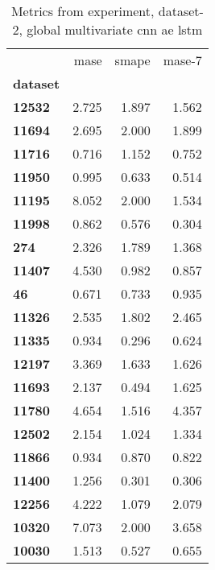 \begin{table}[h]
\centering
\caption{Metrics from experiment, dataset-2, global multivariate cnn ae lstm}
\label{table:global-multivariate-cnn-ae-lstm-dataset-2}
\begin{tabular}{lrrr}
\toprule
{} &   mase &  smape &  mase-7 \\
\textbf{dataset} &        &        &         \\
\midrule
\textbf{12532  } &  2.725 &  1.897 &   1.562 \\
\textbf{11694  } &  2.695 &  2.000 &   1.899 \\
\textbf{11716  } &  0.716 &  1.152 &   0.752 \\
\textbf{11950  } &  0.995 &  0.633 &   0.514 \\
\textbf{11195  } &  8.052 &  2.000 &   1.534 \\
\textbf{11998  } &  0.862 &  0.576 &   0.304 \\
\textbf{274    } &  2.326 &  1.789 &   1.368 \\
\textbf{11407  } &  4.530 &  0.982 &   0.857 \\
\textbf{46     } &  0.671 &  0.733 &   0.935 \\
\textbf{11326  } &  2.535 &  1.802 &   2.465 \\
\textbf{11335  } &  0.934 &  0.296 &   0.624 \\
\textbf{12197  } &  3.369 &  1.633 &   1.626 \\
\textbf{11693  } &  2.137 &  0.494 &   1.625 \\
\textbf{11780  } &  4.654 &  1.516 &   4.357 \\
\textbf{12502  } &  2.154 &  1.024 &   1.334 \\
\textbf{11866  } &  0.934 &  0.870 &   0.822 \\
\textbf{11400  } &  1.256 &  0.301 &   0.306 \\
\textbf{12256  } &  4.222 &  1.079 &   2.079 \\
\textbf{10320  } &  7.073 &  2.000 &   3.658 \\
\textbf{10030  } &  1.513 &  0.527 &   0.655 \\
\bottomrule
\end{tabular}
\end{table}
